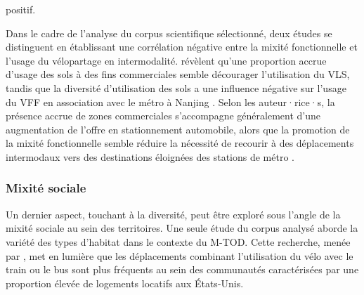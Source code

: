 \begin{refsegment}
positif.%

Dans le cadre de l'analyse du corpus scientifique sélectionné, deux études se distinguent en établissant une corrélation négative entre la mixité fonctionnelle et l'usage du vélopartage en intermodalité. \textcolor{blue}{\textcite[8]{cheng_promoting_2022}} révèlent qu'une proportion accrue d'usage des sols à des fins commerciales semble décourager l'utilisation du \acrshort{VLS}, tandis que la diversité d'utilisation des sols a une influence négative sur l'usage du \acrshort{VFF} en association avec le métro à Nanjing \textcolor{blue}{\autocite[10]{cheng_comparison_2023}}. Selon les auteur·rice·s, la présence accrue de zones commerciales s'accompagne généralement d'une augmentation de l'offre en stationnement automobile, alors que la promotion de la mixité fonctionnelle semble réduire la nécessité de recourir à des déplacements intermodaux vers des destinations éloignées des stations de métro \textcolor{blue}{\autocite[5]{cheng_comparison_2023}}.%

\subsubsection*{Mixité sociale
    \label{chap2:mixite-sociale}
    }
    
Un dernier aspect, touchant à la diversité, peut être exploré sous l'angle de la mixité sociale au sein des territoires. Une seule étude du corpus analysé aborde la variété des types d'habitat dans le contexte du \acrshort{M-TOD}. Cette recherche, menée par \textcolor{blue}{\textcite[115]{wang_bicycle-transit_2013}}, met en lumière que les déplacements combinant l'utilisation du vélo avec le train ou le bus sont plus fréquents au sein des communautés caractérisées par une proportion élevée de logements locatifs aux États-Unis.%


\end{refsegment}
